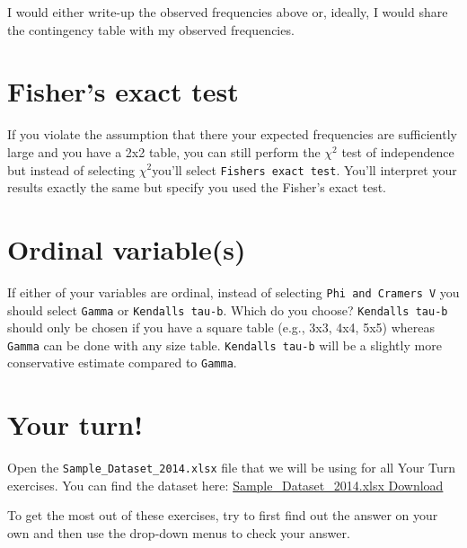 \documentclass[
]{book}
\begin{document}
I would either write-up the observed frequencies above or, ideally, I would share the contingency table with my observed frequencies.

\hypertarget{fishers-exact-test}{%
\section{Fisher's exact test}\label{fishers-exact-test}}

If you violate the assumption that there your expected frequencies are sufficiently large and you have a 2x2 table, you can still perform the \(\chi^2\) test of independence but instead of selecting \(\chi^2\)you'll select \texttt{Fisher\textquotesingle{}s\ exact\ test}. You'll interpret your results exactly the same but specify you used the Fisher's exact test.

\hypertarget{ordinal-variables}{%
\section{Ordinal variable(s)}\label{ordinal-variables}}

If either of your variables are ordinal, instead of selecting \texttt{Phi\ and\ Cramer\textquotesingle{}s\ V} you should select \texttt{Gamma} or \texttt{Kendall\textquotesingle{}s\ tau-b}. Which do you choose? \texttt{Kendall\textquotesingle{}s\ tau-b} should only be chosen if you have a square table (e.g., 3x3, 4x4, 5x5) whereas \texttt{Gamma} can be done with any size table. \texttt{Kendall\textquotesingle{}s\ tau-b} will be a slightly more conservative estimate compared to \texttt{Gamma}.

\hypertarget{your-turn-6}{%
\section{Your turn!}\label{your-turn-6}}

Open the \texttt{Sample\_Dataset\_2014.xlsx} file that we will be using for all Your Turn exercises. You can find the dataset here: \href{https://github.com/danawanzer/stats-with-jamovi/blob/master/data/Sample_Dataset_2014.xlsx}{Sample\_Dataset\_2014.xlsx Download}

To get the most out of these exercises, try to first find out the answer on your own and then use the drop-down menus to check your answer.
\end{document}
